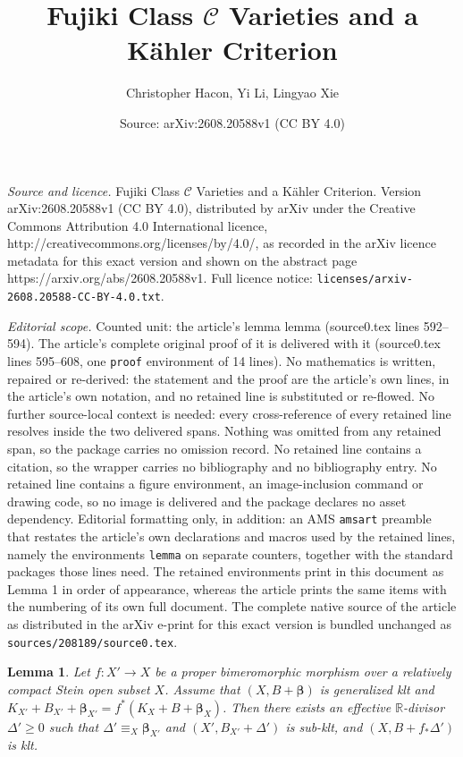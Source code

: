 \documentclass[10pt,a4paper]{amsart}
\title{Fujiki Class $\mathcal C$ Varieties and a K\"ahler Criterion}
\author{Christopher Hacon, Yi Li, Lingyao Xie}
\date{Source: arXiv:2608.20588v1 (CC BY 4.0)}
\newtheorem{lemma}{Lemma}
\def\bbeta{\boldsymbol{\beta}}
\begin{document}
\maketitle

\noindent\emph{Source and licence.} Fujiki Class $\mathcal C$ Varieties and a K\"ahler Criterion. Version arXiv:2608.20588v1 (CC BY 4.0), distributed by arXiv under the Creative Commons Attribution 4.0 International licence, http://creativecommons.org/licenses/by/4.0/, as recorded in the arXiv licence metadata for this exact version and shown on the abstract page https://arxiv.org/abs/2608.20588v1. Full licence notice: \texttt{licenses/arxiv-2608.20588-CC-BY-4.0.txt}.\par\smallskip

\noindent\textit{Editorial scope.} Counted unit: the article's lemma lemma (source0.tex lines 592--594). The article's complete original proof of it is delivered with it (source0.tex lines 595--608, one \texttt{proof} environment of 14 lines). No mathematics is written, repaired or re-derived: the statement and the proof are the article's own lines, in the article's own notation, and no retained line is substituted or re-flowed.  No further source-local context is needed: every cross-reference of every retained line resolves inside the two delivered spans.  Nothing was omitted from any retained span, so the package carries no omission record.  No retained line contains a citation, so the wrapper carries no bibliography and no bibliography entry.  No retained line contains a figure environment, an image-inclusion command or drawing code, so no image is delivered and the package declares no asset dependency.  Editorial formatting only, in addition: an AMS \texttt{amsart} preamble that restates the article's own declarations and macros used by the retained lines, namely the environments \texttt{lemma} on separate counters, together with the standard packages those lines need.  The retained environments print in this document as Lemma 1 in order of appearance, whereas the article prints the same items with the numbering of its own full document.  The complete native source of the article as distributed in the arXiv e-print for this exact version is bundled unchanged as \texttt{sources/208189/source0.tex}.
\begin{lemma}
Let $f: X'\to X$ be a proper bimeromorphic morphism over a relatively compact Stein open subset $X$. Assume that $(X,B+\bbeta)$ is generalized klt and $K_{X'}+B_{X'}+\bbeta_{X'} = f^*(K_X+B+\bbeta_X)$. Then there exists an effective $\mathbb{R}$-divisor $\Delta'\geq 0$ such that $\Delta'\equiv_{X} \bbeta_{X'}$ and $(X',B_{X'}+\Delta')$ is sub-klt, and $(X,B+f_*\Delta')$ is klt.
\end{lemma}
\end{document}
